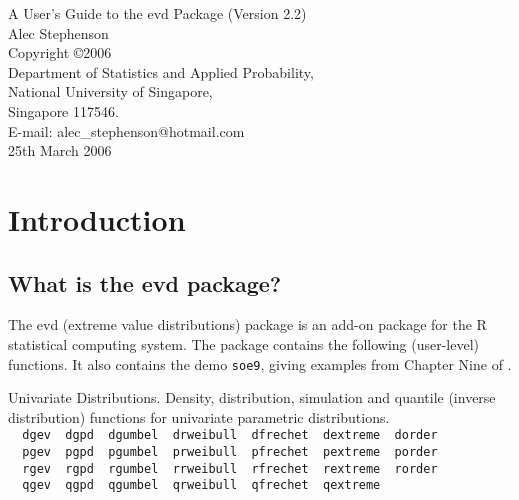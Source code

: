\documentclass[11pt,a4paper]{article}
\begin{document}
\sloppy

\begin{center}
\LARGE 
A User's Guide to the evd Package (Version 2.2) \\
\Large
\vspace{0.2cm}
Alec Stephenson \\
\normalsize
Copyright \copyright 2006 \\
\vspace{0.2cm}
Department of Statistics and Applied Probability,\\
National University of Singapore, \\
Singapore 117546. \\
\vspace{0.2cm}
E-mail: alec\_stephenson@hotmail.com \\
25th March 2006 
\end{center}


\section{Introduction}
\setcounter{footnote}{0}

\subsection{What is the evd package?}
\label{intro}

The evd (extreme value distributions) package is an add-on package for the R \citep{R} statistical computing system.
The package contains the following (user-level) functions.
It also contains the demo \verb+soe9+, giving examples from Chapter Nine of \citet{beirgoeg04}.

Univariate Distributions. Density, distribution, simulation and quantile (inverse distribution) functions for univariate parametric distributions.\\ 
\verb+  dgev  dgpd  dgumbel  drweibull  dfrechet  dextreme  dorder+\\
\verb+  pgev  pgpd  pgumbel  prweibull  pfrechet  pextreme  porder+\\
\verb+  rgev  rgpd  rgumbel  rrweibull  rfrechet  rextreme  rorder+\\
\verb+  qgev  qgpd  qgumbel  qrweibull  qfrechet  qextreme+
\end{document}
